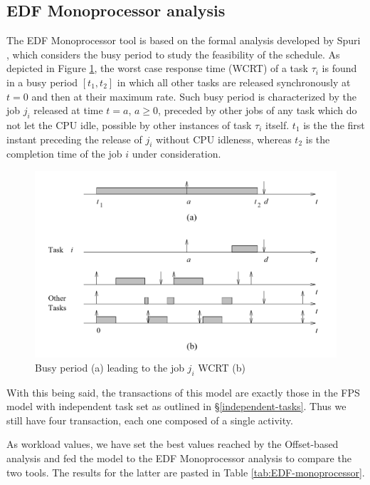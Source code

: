 \documentclass{article}
\begin{document}
\subsection{EDF Monoprocessor analysis}

The EDF Monoprocessor tool is based on the formal analysis developed by Spuri \cite{spuri}, which considers the busy period to study the feasibility of the schedule. As depicted in Figure \ref{fig:spuri}, the worst case response time (WCRT) of a task $\tau_i$ is found in a busy period $[t_{1},t_{2}]$ in which all other tasks are released synchronously at $t=0$ and then at their maximum rate. Such busy period is characterized by the job $j_i$ released at time $t=a$, $a \ge 0$, preceded by other jobs of any task which do not let the CPU idle, possible by other instances of task $\tau_i$ itself. $t_1$ is the the first instant preceding the release of $j_i$ without CPU idleness, whereas $t_{2}$ is the completion time of the job $i$ under consideration.

\begin{figure}[!htbp]
   \centering
   \includegraphics[width=5in]{images/spuri}
   \caption{Busy period (a) leading to the job $j_i$ WCRT (b) \cite{spuri}}
   \label{fig:spuri}
\end{figure}

With this being said, the transactions of this model are exactly those in the FPS model with independent task set as outlined in §\ref{independent-tasks}. Thus we still have four transaction, each one composed of a single activity.

As workload values, we have set the best values reached by the Offset-based analysis and fed the model to the EDF Monoprocessor analysis to compare the two tools. The results for the latter are pasted in Table \ref{tab:EDF-monoprocessor}.
\end{document}
